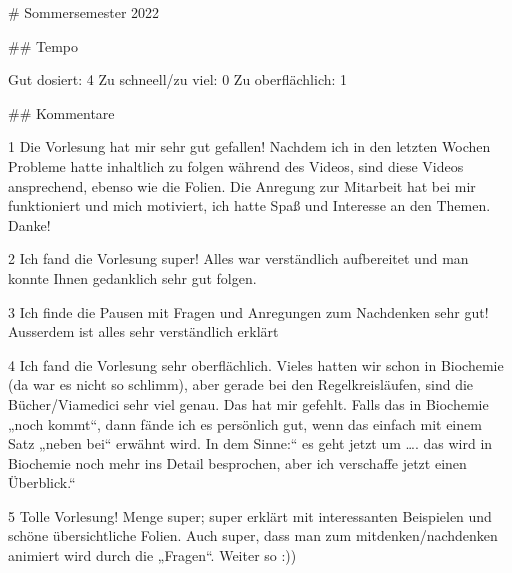 # Sommersemester 2022

## Tempo

Gut dosiert: 4
Zu schneell/zu viel: 0
Zu oberflächlich: 1

## Kommentare

1	Die Vorlesung hat mir sehr gut gefallen! Nachdem ich in den letzten Wochen Probleme hatte inhaltlich zu folgen während des Videos, sind diese Videos ansprechend, ebenso wie die Folien. Die Anregung zur Mitarbeit hat bei mir funktioniert und mich motiviert, ich hatte Spaß und Interesse an den Themen. Danke!

2	Ich fand die Vorlesung super! Alles war verständlich aufbereitet und man konnte Ihnen gedanklich sehr gut folgen.

3	Ich finde die Pausen mit Fragen und Anregungen zum Nachdenken sehr gut! Ausserdem ist alles sehr verständlich erklärt

4	Ich fand die Vorlesung sehr oberflächlich. Vieles hatten wir schon in Biochemie (da war es nicht so schlimm), aber gerade bei den Regelkreisläufen, sind die Bücher/Viamedici sehr viel genau. Das hat mir gefehlt. Falls das in Biochemie „noch kommt“, dann fände ich es persönlich gut, wenn das einfach mit einem Satz „neben bei“ erwähnt wird. In dem Sinne:“ es geht jetzt um …. das wird in Biochemie noch mehr ins Detail besprochen, aber ich verschaffe jetzt einen Überblick.“

5	Tolle Vorlesung! Menge super; super erklärt mit interessanten Beispielen und schöne übersichtliche Folien. Auch super, dass man zum mitdenken/nachdenken animiert wird durch die „Fragen“. Weiter so :)) 